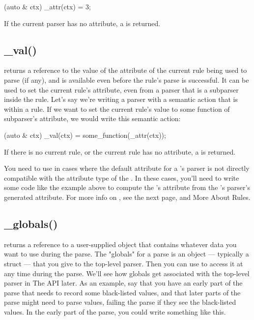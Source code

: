 \documentclass{MyBook}
\begin{document}
\begin{code}
[](auto & ctx) { _attr(ctx) = 3; }
\end{code}

If the current parser has no attribute, a  is returned.

\subsection{\_val()}

 returns a reference to the value of the attribute of the current rule being used to parse (if any), and is available even before the rule's parse is successful. It can be used to set the current rule's attribute, even from a parser that is a subparser inside the rule. Let's say we're writing a parser with a semantic action that is within a rule. If we want to set the current rule's value to some function of subparser's attribute, we would write this semantic action:

\begin{code}
[](auto & ctx) { _val(ctx) = some_function(_attr(ctx)); }
\end{code}

If there is no current rule, or the current rule has no attribute, a  is returned.

You need to use  in cases where the default attribute for a 's parser is not directly compatible with the attribute type of the . In these cases, you'll need to write some code like the example above to compute the 's attribute from the 's parser's generated attribute. For more info on , see the next page, and More About Rules.

\subsection{\_globals()}

 returns a reference to a user-supplied object that contains whatever data you want to use during the parse. The "globals" for a parse is an object --- typically a struct --- that you give to the top-level parser. Then you can use  to access it at any time during the parse. We'll see how globals get associated with the top-level parser in The  API later. As an example, say that you have an early part of the parse that needs to record some black-listed values, and that later parts of the parse might need to parse values, failing the parse if they see the black-listed values. In the early part of the parse, you could write something like this.
\end{document}
